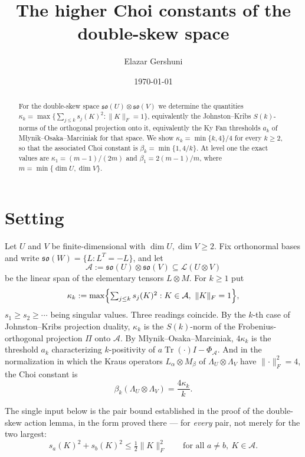 \documentclass[11pt,reqno]{amsart}
\title{The higher Choi constants of the double-skew space}
\author{Elazar Gershuni}
\date{\today}
\theoremstyle{plain}
\theoremstyle{remark}
\DeclareMathOperator{\Tr}{Tr}
\newcommand{\cL}{\mathcal L}
\newcommand{\norm}[1]{\lVert #1\rVert}
\begin{document}
\begin{abstract}
For the double-skew space $\mathfrak{so}(U)\otimes\mathfrak{so}(V)$ we
determine the quantities
$\kappa_k=\max\{\sum_{j\le k}s_j(K)^2:\norm K_F=1\}$, equivalently the
Johnston--Kribs $S(k)$-norms of the orthogonal projection onto it, equivalently
the Ky Fan thresholds $a_k$ of M\l ynik--Osaka--Marciniak for that space.  We
show $\kappa_k=\min\{k,4\}/4$ for every $k\ge2$, so that the associated Choi
constant is $\beta_k=\min\{1,4/k\}$. At level one the exact values are
$\kappa_1=(m-1)/(2m)$ and $\beta_1=2(m-1)/m$, where
$m=\min\{\dim U,\dim V\}$.
\end{abstract}
\maketitle

\section{Setting}

Let $U$ and $V$ be finite-dimensional with
$\dim U,\dim V\ge2$.  Fix orthonormal bases and write
$\mathfrak{so}(W)=\{L:L^T=-L\}$, and let
\[
    \mathcal A:=\mathfrak{so}(U)\otimes\mathfrak{so}(V)\subseteq\cL(U\otimes V)
\]
be the linear span of the elementary tensors $L\otimes M$.  For $k\ge1$ put
\begin{equation}
\label{eq:kappa}
    \kappa_k
    :=
    \max\Bigl\{\textstyle\sum_{j\le k}s_j(K)^2
      :K\in\mathcal A,\ \norm K_F=1\Bigr\},
\end{equation}
$s_1\ge s_2\ge\cdots$ being singular values.  Three readings coincide.  By the
$k$-th case of Johnston--Kribs projection duality, $\kappa_k$ is the $S(k)$-norm
of the Frobenius-orthogonal projection $\Pi$ onto $\mathcal A$.  By
M\l ynik--Osaka--Marciniak, $4\kappa_k$ is the threshold $a_k$ characterizing
$k$-positivity of $a\Tr(\cdot)I-\Phi_{\mathcal A}$.  And in the normalization in
which the Kraus operators $L_\alpha\otimes M_\beta$ of
$\Lambda_U\otimes\Lambda_V$ have $\norm{\cdot}_F^2=4$, the Choi constant is
\begin{equation}
\label{eq:beta-kappa}
    \beta_k(\Lambda_U\otimes\Lambda_V)=\frac{4\kappa_k}{k}.
\end{equation}

The single input below is the pair bound established in the proof of the
double-skew action lemma, in the form proved there --- for \emph{every} pair,
not merely for the two largest:
\begin{equation}
\label{eq:pair}
    s_a(K)^2+s_b(K)^2\le\tfrac12\norm K_F^2
    \qquad\text{for all }a\ne b,\ K\in\mathcal A .
\end{equation}
\end{document}
